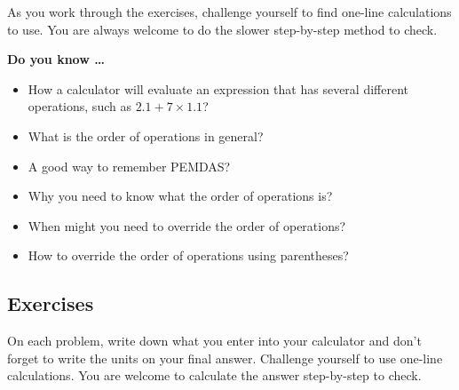 As you work through the exercises, challenge yourself to find one-line calculations to use. You are always welcome to do the slower step-by-step method to check.

 

\noindent \textbf{Do you know \ldots}

\begin{itemize}
\item How a calculator will evaluate an expression that has several different operations, such as $2.1 + 7 \times 1.1$? %
\item What is the order of operations in general?  %
\item A good way to remember PEMDAS? %
\item Why you need to know what the order of operations is? %
\item When might you need to override the order of operations? %
\item How to override the order of operations using parentheses? %
  
\end{itemize}

\subsection*{Exercises}

On each problem, write down what you enter into your calculator and don't forget to write the units on your final answer.  Challenge yourself to use one-line calculations. You are welcome to calculate the answer step-by-step to check.

